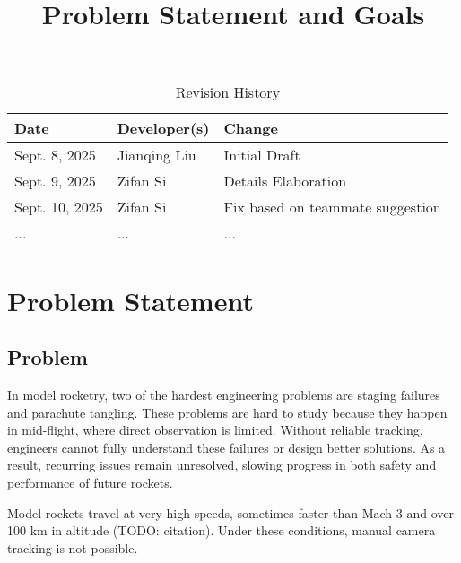 \documentclass{article}
\title{Problem Statement and Goals\\\progname}
\author{\authname}
\date{}
\begin{document}
\maketitle

\begin{table}[hp]
    \caption{Revision History} \label{TblRevisionHistory}
    \begin{tabularx}{\textwidth}{llX}
        \toprule
        \textbf{Date}  & \textbf{Developer(s)} & \textbf{Change}                  \\
        \midrule
        Sept. 8, 2025  & Jianqing Liu          & Initial Draft                    \\
        Sept. 9, 2025  & Zifan Si              & Details Elaboration              \\
        Sept. 10, 2025 & Zifan Si              & Fix based on teammate suggestion \\
        ...            & ...                   & ...                              \\
        \bottomrule
    \end{tabularx}
\end{table}

\section{Problem Statement}



\subsection{Problem}

In model rocketry, two of the hardest engineering problems are staging failures
and parachute tangling. These problems are hard to study because they happen in
mid-flight, where direct observation is limited. Without reliable tracking,
engineers cannot fully understand these failures or design better solutions. As
a result, recurring issues remain unresolved, slowing progress in both safety
and performance of future rockets.

Model rockets travel at very high speeds, sometimes faster than Mach 3 and over
100 km in altitude (TODO: citation). Under these conditions, manual camera
tracking is not possible.
\end{document}
